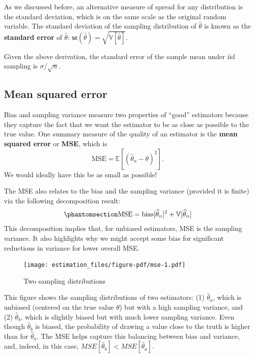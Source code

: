 \documentclass[
  13pt,
  letterpaper,
  DIV=11,
  numbers=noendperiod]{scrreprt}
\newcommand{\E}{\mathbb{E}}
\newcommand{\V}{\mathbb{V}}
\newcommand{\se}{\textsf{se}}
\theoremstyle{plain}
\theoremstyle{definition}
\theoremstyle{definition}
\theoremstyle{remark}
\begin{document}
As we discussed before, an alternative measure of spread for any
distribution is the standard deviation, which is on the same scale as
the original random variable. The standard deviation of the sampling
distribution of \(\widehat{\theta}\) is known as the \textbf{standard
error} of \(\widehat{\theta}\):
\(\se(\widehat{\theta}) = \sqrt{\V[\widehat{\theta}]}\).

Given the above derivation, the standard error of the sample mean under
iid sampling is \(\sigma / \sqrt{n}\).

\subsection{Mean squared error}\label{mean-squared-error}

Bias and sampling variance measure two properties of ``good'' estimators
because they capture the fact that we want the estimator to be as close
as possible to the true value. One summary measure of the quality of an
estimator is the \textbf{mean squared error} or \textbf{MSE}, which is\\
\[
\text{MSE} = \E[(\widehat{\theta}_n-\theta)^2].
\] We would ideally have this be as small as possible!

The MSE also relates to the bias and the sampling variance (provided it
is finite) via the following decomposition result:
\begin{equation}\phantomsection\label{eq-mse-decomposition}{
\text{MSE} = \text{bias}[\widehat{\theta}_n]^2 + \V[\widehat{\theta}_n]
}\end{equation} This decomposition implies that, for unbiased
estimators, MSE is the sampling variance. It also highlights why we
might accept some bias for significant reductions in variance for lower
overall MSE.

\begin{figure}[th]

{\centering \texttt{[image: estimation\_files/figure-pdf/mse-1.pdf]}

}

\caption{Two sampling distributions}

\end{figure}%

This figure shows the sampling distributions of two estimators: (1)
\(\widehat{\theta}_a\), which is unbiased (centered on the true value
\(\theta\)) but with a high sampling variance, and (2)
\(\widehat{\theta}_b\), which is slightly biased but with much lower
sampling variance. Even though \(\widehat{\theta}_b\) is biased, the
probability of drawing a value close to the truth is higher than for
\(\widehat{\theta}_a\). The MSE helps capture this balancing between
bias and variance, and, indeed, in this case,
\(MSE[\widehat{\theta}_b] < MSE[\widehat{\theta}_a]\).
\end{document}
